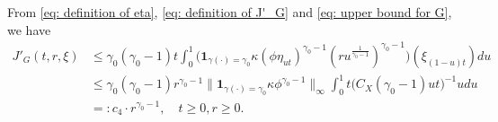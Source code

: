 \documentclass[12pt, a4paper]{amsart}
\theoremstyle{definition}
\numberwithin{equation}{section}
\begin{document}
	From \eqref{eq: definition of eta}, \eqref{eq: definition of J'_G} and \eqref{eq: upper bound for G}, we have
\begin{equation}\label{eq: upper bound for J'_G} \begin{split}
	J'_G(t,r,\xi)
	&\leq \gamma_0 (\gamma_0 - 1) t \int_0^1 \big( \mathbf 1_{\gamma(\cdot) = \gamma_0} \kappa (\phi \eta_{ut})^{\gamma_0 - 1} (ru^{\frac{1}{\gamma_0 - 1}})^{\gamma_0 - 1}\big) (\xi_{(1-u)t}) du
	\\&\leq \gamma_0(\gamma_0 - 1) r^{\gamma_0 - 1} \big\|   \mathbf 1_{\gamma(\cdot) = \gamma_0}  \kappa \phi^{\gamma_0 - 1} \big\|_\infty \int_0^1 t \big(  C_X(\gamma_0 - 1) ut \big)^{- 1}  u  du
	\\&=: c_4 \cdot r^{\gamma_0 - 1},
	\quad t\geq 0, r\geq 0.
\end{split}\end{equation}
\end{document}
